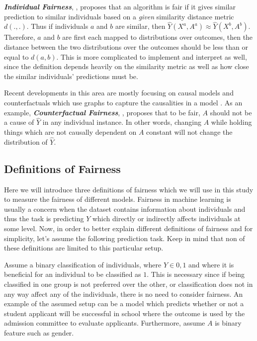 \textbf{\textit{Individual Fairness}}, \citet{dwork2012fairness}, proposes that an algorithm is fair if it gives similar prediction to similar individuals based on a \textit{given} similarity distance metric $d(., .)$. Thus if individuals $a$ and $b$ are similar, then $\hat{Y}(X^a, A^a) \approx \hat{Y}(X^b, A^b)$. Therefore, $a$ and $b$  are first each mapped to distributions over outcomes, then the distance between the two distributions over the outcomes should be less than or equal to $d(a, b)$.
This is more complicated to implement \cite{joseph2016rawlsian, louizos2015variational} and interpret as well, since the definition depends heavily on the similarity metric as well as how close the similar individuals' predictions must be. 

Recent developments in this area are mostly focusing on causal models and counterfactuals which use graphs to capture the causalities in a model \cite{kusner2017counterfactual, zhang2018fairness, chiappa2018path, russell2017worlds}. As an example, \textbf{\textit{Counterfactual Fairness}}, \citet{kusner2017counterfactual}, proposes that to be fair, $A$ should not be a cause of $\hat{Y}$ in any individual instance. In other words, changing $A$ while holding things which are not causally dependent on $A$ constant will not change the distribution of $\hat{Y}$.

\subsection{Definitions of Fairness} \label{subsec:def-of-fairness}
Here we will introduce three definitions of fairness which we will use in this study to measure the fairness of different models. Fairness in machine learning is usually a concern when the dataset contains information about individuals and thus the task is predicting $Y$ which directly or indirectly affects individuals at some level. Now, in order to better explain different definitions of fairness and for simplicity, let's assume the following prediction task. Keep in mind that non of these definitions are limited to this particular setup.

Assume a binary classification of individuals, where $Y \in {0, 1}$ and where it is beneficial for an individual to be classified as $1$. This is necessary since if being classified in one group is not preferred over the other, or classification does not in any way affect any of the individuals, there is no need to consider fairness. An example of the assumed setup can be a model which predicts whether or not a student applicant will be successful in school where the outcome is used by the admission committee to evaluate applicants. Furthermore, assume $A$ is binary feature such as gender. 

